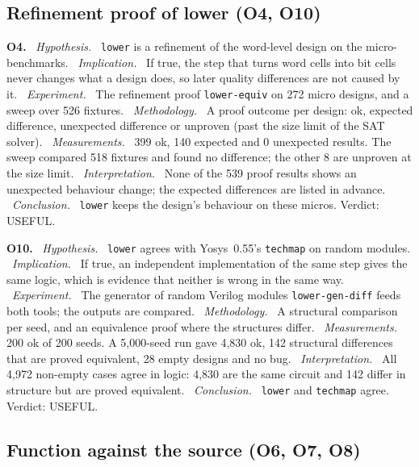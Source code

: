 \documentclass[conference]{IEEEtran}
\newcommand{\code}[1]{\texttt{#1}}
\newcommand{\argid}[1]{\par\smallskip\noindent\textbf{#1.}}
\newcommand{\ah}[1]{\ \textit{#1.}\ }
\begin{document}
\subsection{Refinement proof of lower (O4, O10)}
\label{sec:q-proof}
\label{sec:verify-evidence}

\argid{O4}
\ah{Hypothesis} \code{lower} is a refinement of the word-level design on the micro-benchmarks.
\ah{Implication} If true, the step that turns word cells into bit cells never changes what a design does, so later quality differences are not caused by it.
\ah{Experiment} The refinement proof \code{lower-equiv} on 272 micro designs, and a sweep over 526 fixtures.
\ah{Methodology} A proof outcome per design: ok, expected difference, unexpected difference or unproven (past the size limit of the SAT solver).
\ah{Measurements} 399 ok, 140 expected and 0 unexpected results. The sweep compared 518 fixtures and found no difference; the other 8 are unproven at the size limit.
\ah{Interpretation} None of the 539 proof results shows an unexpected behaviour change; the expected differences are listed in advance.
\ah{Conclusion} \code{lower} keeps the design's behaviour on these micros. Verdict: USEFUL.

\argid{O10}
\ah{Hypothesis} \code{lower} agrees with Yosys~0.55's \code{techmap} on random modules.
\ah{Implication} If true, an independent implementation of the same step gives the same logic, which is evidence that neither is wrong in the same way.
\ah{Experiment} The generator of random Verilog modules \code{lower-gen-diff} feeds both tools; the outputs are compared.
\ah{Methodology} A structural comparison per seed, and an equivalence proof where the structures differ.
\ah{Measurements} 200 ok of 200 seeds. A 5,000-seed run gave 4,830 ok, 142 structural differences that are proved equivalent, 28 empty designs and no bug.
\ah{Interpretation} All 4,972 non-empty cases agree in logic: 4,830 are the same circuit and 142 differ in structure but are proved equivalent.
\ah{Conclusion} \code{lower} and \code{techmap} agree. Verdict: USEFUL.

\subsection{Function against the source (O6, O7, O8)}
\end{document}
